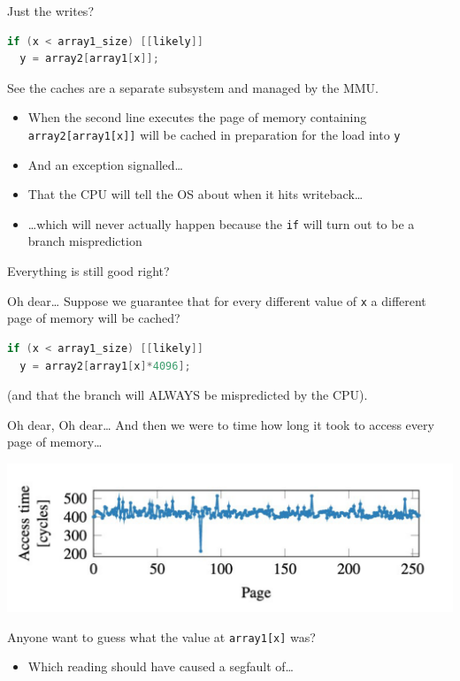 \documentclass[9pt,aspectratio=169]{beamer}
\begin{document}
\begin{frame}[label={sec:org25338d7},fragile]{Just the writes?}
 \begin{lstlisting}[language=C,numbers=none]
if (x < array1_size) [[likely]]
  y = array2[array1[x]];
\end{lstlisting}

See the caches are a separate subsystem and managed by the MMU.
\begin{itemize}
\item When the second line executes the page of memory containing \texttt{array2[array1[x]]} will be cached in preparation for the load into \texttt{y}
\item And an exception signalled\ldots{}
\item That the CPU will tell the OS about when it hits writeback\ldots{}
\item \ldots{}which will never actually happen because the \texttt{if} will turn out to be a branch misprediction
\end{itemize}

\begin{block}{Everything is still good right?}
\end{block}
\end{frame}

\begin{frame}[label={sec:org70b63f2},fragile]{Oh dear\ldots{}}
 Suppose we guarantee that for every different value of \texttt{x} a different page of memory will be cached?

\begin{lstlisting}[language=C,numbers=none]
if (x < array1_size) [[likely]]
  y = array2[array1[x]*4096];
\end{lstlisting}

(and that the branch will ALWAYS be mispredicted by the CPU).
\end{frame}

\begin{frame}[label={sec:org631d9ae},fragile]{Oh dear, Oh dear\ldots{}}
 And then we were to time how long it took to access every page of memory\ldots{}

\begin{center}
\includegraphics[width=\linewidth]{./pagetimes.png}
\end{center}

Anyone want to guess what the value at \texttt{array1[x]} was?
\begin{itemize}
\item Which reading should have caused a segfault of\ldots{}
\end{itemize}
\end{frame}
\end{document}
